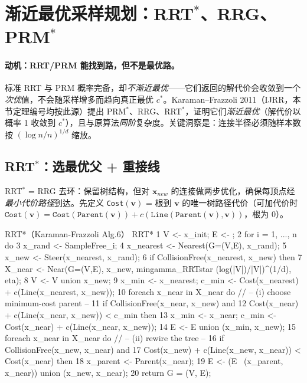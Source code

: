 \section{渐近最优采样规划：RRT\texorpdfstring{$^*$}{^*}、RRG、PRM\texorpdfstring{$^*$}{^*}}
\label{sec:plan-optimal}

\paragraph{动机：RRT/PRM 能找到路，但不是最优路。}
标准 RRT 与 PRM 概率完备，却\emph{不渐近最优}——它们返回的解代价会收敛到一个\emph{次优}值，不会随采样增多而趋向真正最优 $c^*$。Karaman--Frazzoli 2011\cite{karaman2011sampling}（IJRR，本节定理编号均按此源）提出 PRM$^*$、RRG、RRT$^*$，证明它们\emph{渐近最优}（解代价以概率 1 收敛到 $c^*$），且与原算法\emph{同阶}复杂度。关键洞察是：连接半径必须随样本数按 $(\log n/n)^{1/d}$ 缩放。

\subsection{RRT\texorpdfstring{$^*$}{^*}：选最优父 + 重接线}
\label{sec:plan-rrtstar}

RRT$^*$ = RRG 去环：保留树结构，但对 $\mathbf{x}_{new}$ 的连接做两步优化，确保每顶点经\emph{最小代价路径}到达。先定义 \texttt{Cost}$(\mathbf{v})$ = 根到 $\mathbf{v}$ 的唯一树路径代价（可加代价时 $\texttt{Cost}(\mathbf{v})=\texttt{Cost}(\texttt{Parent}(\mathbf{v}))+c(\texttt{Line}(\texttt{Parent}(\mathbf{v}),\mathbf{v}))$，根为 0）。

\begin{algo}[RRT$^*$]\label{alg:plan-rrtstar}
\end{algo}
\begin{codebox}[text]{RRT*（Karaman-Frazzoli Alg.6）}
RRT*
 1  V <- {x_init};  E <- {};
 2  for i = 1, ..., n do
 3      x_rand    <- SampleFree_i;
 4      x_nearest <- Nearest(G=(V,E), x_rand);
 5      x_new     <- Steer(x_nearest, x_rand);
 6      if CollisionFree(x_nearest, x_new) then
 7          X_near <- Near(G=(V,E), x_new, min{gamma_RRTstar (log(|V|)/|V|)^(1/d), eta});
 8          V <- V union {x_new};
 9          x_min <- x_nearest;  c_min <- Cost(x_nearest) + c(Line(x_nearest, x_new));
10          foreach x_near in X_near do                 // -- (i) choose minimum-cost parent --
11              if CollisionFree(x_near, x_new) and
12                 Cost(x_near) + c(Line(x_near, x_new)) < c_min then
13                  x_min <- x_near;  c_min <- Cost(x_near) + c(Line(x_near, x_new));
14          E <- E union {(x_min, x_new)};
15          foreach x_near in X_near do                 // -- (ii) rewire the tree --
16              if CollisionFree(x_new, x_near) and
17                 Cost(x_new) + c(Line(x_new, x_near)) < Cost(x_near) then
18                  x_parent <- Parent(x_near);
19                  E <- (E \ {(x_parent, x_near)}) union {(x_new, x_near)};
20  return G = (V, E);
\end{codebox}

